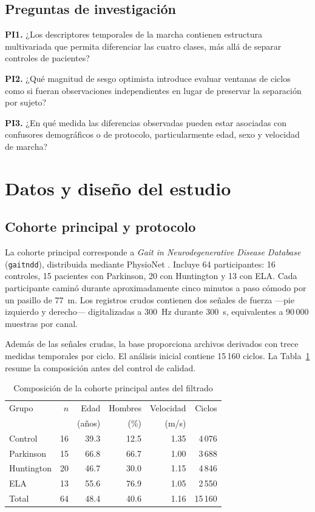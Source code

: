 \documentclass[conference]{IEEEtran}
\begin{document}
\subsection{Preguntas de investigación}
\textbf{PI1.} ¿Los descriptores temporales de la marcha contienen estructura multivariada que permita diferenciar las cuatro clases, más allá de separar controles de pacientes?

\textbf{PI2.} ¿Qué magnitud de sesgo optimista introduce evaluar ventanas de ciclos como si fueran observaciones independientes en lugar de preservar la separación por sujeto?

\textbf{PI3.} ¿En qué medida las diferencias observadas pueden estar asociadas con confusores demográficos o de protocolo, particularmente edad, sexo y velocidad de marcha?

\section{Datos y diseño del estudio}

\subsection{Cohorte principal y protocolo}
La cohorte principal corresponde a \textit{Gait in Neurodegenerative Disease Database} (\texttt{gaitndd}), distribuida mediante PhysioNet \cite{hausdorff2000,goldberger2000}. Incluye 64 participantes: 16 controles, 15 pacientes con Parkinson, 20 con Huntington y 13 con ELA. Cada participante caminó durante aproximadamente cinco minutos a paso cómodo por un pasillo de 77~m. Los registros crudos contienen dos señales de fuerza ---pie izquierdo y derecho--- digitalizadas a 300~Hz durante 300~s, equivalentes a 90\,000 muestras por canal.

Además de las señales crudas, la base proporciona archivos derivados con trece medidas temporales por ciclo. El análisis inicial contiene 15\,160 ciclos. La Tabla~\ref{tab:cohorte} resume la composición antes del control de calidad.

\begin{table}[t]
\caption{Composición de la cohorte principal antes del filtrado}
\label{tab:cohorte}
\centering
\small
\begin{tabular}{lrrrrr}
\toprule
Grupo & $n$ & Edad & Hombres & Velocidad & Ciclos \\
 & & (años) & (\%) & (m/s) & \\
\midrule
Control    & 16 & 39.3 & 12.5 & 1.35 & 4\,076 \\
Parkinson  & 15 & 66.8 & 66.7 & 1.00 & 3\,688 \\
Huntington & 20 & 46.7 & 30.0 & 1.15 & 4\,846 \\
ELA        & 13 & 55.6 & 76.9 & 1.05 & 2\,550 \\
\midrule
Total      & 64 & 48.4 & 40.6 & 1.16 & 15\,160 \\
\bottomrule
\end{tabular}
\end{table}
\end{document}
